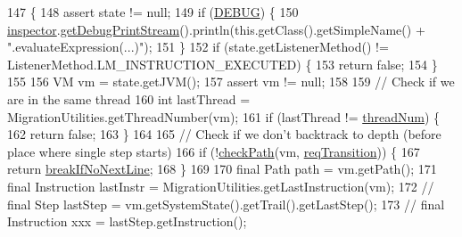 \begin{DoxyCode}
147                                                            \{
148     assert state != null;
149     \textcolor{keywordflow}{if} (\hyperlink{classgov_1_1nasa_1_1jpf_1_1inspector_1_1server_1_1expression_1_1expressions_1_1_expression_breakpoint_single_step_a2a2ffe17a397772a214c372acfd0ce3b}{DEBUG}) \{
150       \hyperlink{classgov_1_1nasa_1_1jpf_1_1inspector_1_1server_1_1expression_1_1expressions_1_1_expression_breakpoint_single_step_ae63a59368500e841baaeafb3eea51ed1}{inspector}.\hyperlink{classgov_1_1nasa_1_1jpf_1_1inspector_1_1server_1_1jpf_1_1_j_p_f_inspector_ab936b10b647a6262639d6474fcba6a16}{getDebugPrintStream}().println(this.getClass().getSimpleName() +
       \textcolor{stringliteral}{".evaluateExpression(...)"});
151     \}
152     \textcolor{keywordflow}{if} (state.getListenerMethod() != ListenerMethod.LM\_INSTRUCTION\_EXECUTED) \{
153       \textcolor{keywordflow}{return} \textcolor{keyword}{false};
154     \}
155 
156     VM vm = state.getJVM();
157     assert vm != null;
158 
159     \textcolor{comment}{// Check if we are in the same thread}
160     \textcolor{keywordtype}{int} lastThread = MigrationUtilities.getThreadNumber(vm);
161     \textcolor{keywordflow}{if} (lastThread != \hyperlink{classgov_1_1nasa_1_1jpf_1_1inspector_1_1server_1_1expression_1_1expressions_1_1_expression_breakpoint_single_step_ab9ef9743d0201ee905cdbcea9fceacfd}{threadNum}) \{
162       \textcolor{keywordflow}{return} \textcolor{keyword}{false};
163     \}
164 
165     \textcolor{comment}{// Check if we don't backtrack to depth (before place where single step starts)}
166     \textcolor{keywordflow}{if} (!\hyperlink{classgov_1_1nasa_1_1jpf_1_1inspector_1_1server_1_1expression_1_1expressions_1_1_expression_breakpoint_single_step_a61cb5b491700728f30efa541e0af8129}{checkPath}(vm, \hyperlink{classgov_1_1nasa_1_1jpf_1_1inspector_1_1server_1_1expression_1_1expressions_1_1_expression_breakpoint_single_step_ab078534bbcd6b9dec2172eac86c50b90}{reqTransition})) \{
167       \textcolor{keywordflow}{return} \hyperlink{classgov_1_1nasa_1_1jpf_1_1inspector_1_1server_1_1expression_1_1expressions_1_1_expression_breakpoint_single_step_a23bd1dfef63f55b2ed939652f03dbdea}{breakIfNoNextLine};
168     \}
169 
170     \textcolor{keyword}{final} Path path = vm.getPath();
171     \textcolor{keyword}{final} Instruction lastInstr = MigrationUtilities.getLastInstruction(vm);
172     \textcolor{comment}{// final Step lastStep = vm.getSystemState().getTrail().getLastStep();}
173     \textcolor{comment}{// final Instruction xxx = lastStep.getInstruction();}

\end{DoxyCode}
